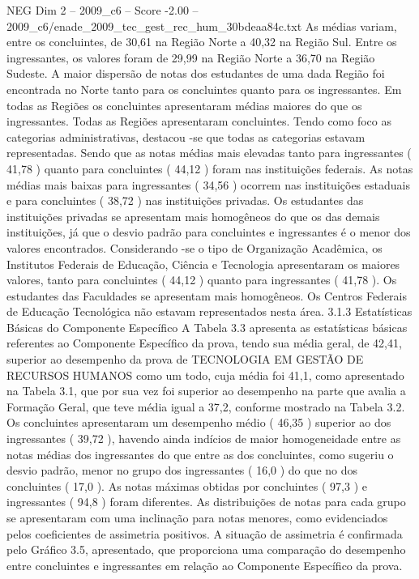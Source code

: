 \begin{textsample}{NEG Dim 2 – 2009\_c6 – Score -2.00 – 2009\_c6/enade\_2009\_tec\_gest\_rec\_hum\_30bdeaa84c.txt}
As médias variam, entre os concluintes, de 30,61 na Região Norte a 40,32 na Região Sul.
Entre os ingressantes, os valores foram de 29,99 na Região Norte a 36,70 na Região Sudeste.
A maior dispersão de notas dos estudantes de uma dada Região foi encontrada no Norte tanto para os concluintes quanto para os ingressantes.
Em todas as Regiões os concluintes apresentaram médias maiores do que os ingressantes.
Todas as Regiões apresentaram concluintes.
Tendo como foco as categorias administrativas, destacou -se que todas as categorias estavam representadas.
Sendo que as notas médias mais elevadas tanto para ingressantes ( 41,78 ) quanto para concluintes ( 44,12 ) foram nas instituições federais.
As notas médias mais baixas para ingressantes ( 34,56 ) ocorrem nas instituições estaduais e para concluintes ( 38,72 ) nas instituições privadas.
Os estudantes das instituições privadas se apresentam mais homogêneos do que os das demais instituições, já que o desvio padrão para concluintes e ingressantes é o menor dos valores encontrados.
Considerando -se o tipo de Organização Acadêmica, os Institutos Federais de Educação, Ciência e Tecnologia apresentaram os maiores valores, tanto para concluintes ( 44,12 ) quanto para ingressantes ( 41,78 ).
Os estudantes das Faculdades se apresentam mais homogêneos.
Os Centros Federais de Educação Tecnológica não estavam representados nesta área. 3.1.3 Estatísticas Básicas do Componente Específico A Tabela 3.3 apresenta as estatísticas básicas referentes ao Componente Específico da prova, tendo sua média geral, de 42,41, superior ao desempenho da prova de TECNOLOGIA EM GESTÃO DE RECURSOS HUMANOS como um todo, cuja média foi 41,1, como apresentado na Tabela 3.1, que por sua vez foi superior ao desempenho na parte que avalia a Formação Geral, que teve média igual a 37,2, conforme mostrado na Tabela 3.2.
Os concluintes apresentaram um desempenho médio ( 46,35 ) superior ao dos ingressantes ( 39,72 ), havendo ainda indícios de maior homogeneidade entre as notas médias dos ingressantes do que entre as dos concluintes, como sugeriu o desvio padrão, menor no grupo dos ingressantes ( 16,0 ) do que no dos concluintes ( 17,0 ).
As notas máximas obtidas por concluintes ( 97,3 ) e ingressantes ( 94,8 ) foram diferentes.
As distribuições de notas para cada grupo se apresentaram com uma inclinação para notas menores, como evidenciados pelos coeficientes de assimetria positivos.
A situação de assimetria é confirmada pelo Gráfico 3.5, apresentado, que proporciona uma comparação do desempenho entre concluintes e ingressantes em relação ao Componente Específico da prova.

\end{textsample}
